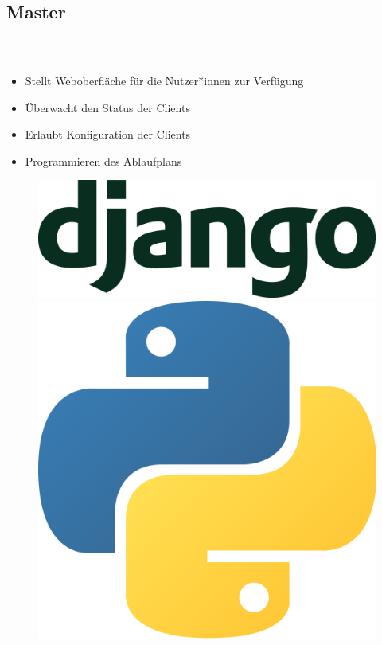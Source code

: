 \documentclass[accentcolor=tud1b,colorbacktitle,landscape,german,presentation]{tudbeamer}
\newcommand{\ftitle}{

	\frametitle{\insertsectionhead \\ {\small \insertsubsectionhead}}
}
\begin{document}
\subsection{Master}
\begin{frame}
	\ftitle
	\begin{itemize}
		\item Stellt Weboberfläche für die Nutzer*innen zur Verfügung\pause
		\item Überwacht den Status der Clients\pause
		\item Erlaubt Konfiguration der Clients\pause
		\item Programmieren des Ablaufplans\pause
	\end{itemize}
	\vspace{0.5cm}
	\begin{figure}
		\centering
		\includegraphics[scale=0.1]{django}
		\hspace{3cm}
		\includegraphics[scale=0.05]{python}
	\end{figure}
\end{frame}
\end{document}
